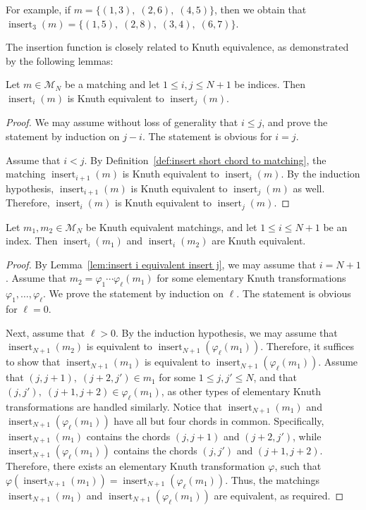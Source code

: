 \documentclass[ALCO]{cedram}
\newcommand{\insrt}{\operatorname{insert}}
\newcommand{\M}{\mathcal{M}}
\begin{document}
For example, if $m = \{(1,3),\; (2,6),\; (4,5)\}$, then we obtain that $\insrt_3(m) = \{(1,5),\; (2,8),\; (3,4),\; (6,7)\}$.

The insertion function is closely related to Knuth equivalence, as demonstrated by the following lemmas:

\begin{lemma}
\label{lem:insert i equivalent insert j}
    Let $m \in \M_N$ be a matching and let $1 \le i,j \le N+1$ be indices. Then $\insrt_i(m)$ is Knuth equivalent to $\insrt_j(m)$.
\end{lemma}
\begin{proof}
    We may assume without loss of generality that $i \le j$, and prove the statement by induction on $j-i$. The statement is obvious for $i=j$.

    Assume that $i < j$. By Definition~\ref{def:insert short chord to matching}, the matching $\insrt_{i+1}(m)$ is Knuth equivalent to $\insrt_i(m)$. By the induction hypothesis, $\insrt_{i+1}(m)$ is Knuth equivalent to $\insrt_j(m)$ as well. Therefore, $\insrt_i(m)$ is Knuth equivalent to $\insrt_j(m)$.
\end{proof}

\begin{lemma}
\label{lem:insert same chord to equivalent remains equivalent}
    Let $m_1,m_2 \in \M_N$ be Knuth equivalent matchings, and let $1 \le i \le N+1$ be an index. Then $\insrt_i(m_1)$ and $\insrt_i(m_2)$ are Knuth equivalent.
\end{lemma}

\begin{proof}
    By Lemma~\ref{lem:insert i equivalent insert j}, we may assume that $i = N+1$. Assume that $m_2 = \varphi_1 \cdots \varphi_\ell (m_1)$ for some elementary Knuth transformations $\varphi_1, \dots, \varphi_\ell$. We prove the statement by induction on $\ell$. The statement is obvious for $\ell = 0$.

    Next, assume that $\ell > 0$. By the induction hypothesis, we may assume that $\insrt_{N+1}(m_2)$ is equivalent to $\insrt_{N+1}(\varphi_\ell(m_1))$. Therefore, it suffices to show that $\insrt_{N+1}(m_1)$ is equivalent to $\insrt_{N+1}(\varphi_\ell(m_1))$. Assume that $(j,j+1),\; (j+2,j') \in m_1$ for some $1 \le j,j' \le N$, and that $(j,j'),\; (j+1,j+2) \in \varphi_\ell(m_1)$, as other types of elementary Knuth transformations are handled similarly. Notice that $\insrt_{N+1}(m_1)$ and $\insrt_{N+1}(\varphi_\ell(m_1))$ have all but four chords in common. Specifically, $\insrt_{N+1}(m_1)$ contains the chords $(j,j+1)$ and $(j+2,j')$, while $\insrt_{N+1}(\varphi_\ell(m_1))$ contains the chords $(j,j')$ and $(j+1,j+2)$. Therefore, there exists an elementary Knuth transformation $\varphi$, such that $\varphi(\insrt_{N+1}(m_1)) = \insrt_{N+1}(\varphi_\ell(m_1))$. Thus, the matchings $\insrt_{N+1}(m_1)$ and $\insrt_{N+1}(\varphi_\ell(m_1))$ are equivalent, as required.
\end{proof}
\end{document}
